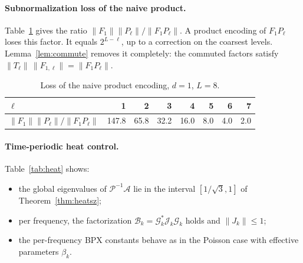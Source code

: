 \documentclass[11pt,a4paper]{article}
\newcommand{\A}{\mathcal{A}}
\newcommand{\B}{\mathcal{B}}
\newcommand{\G}{\mathcal{G}}
\newcommand{\J}{\mathcal{J}}
\theoremstyle{remark}
\begin{document}
\paragraph{Subnormalization loss of the naive product.} Table~\ref{tab:loss}
gives the ratio $\|F_1\|\|P_\ell\|/\|F_1P_\ell\|$. A product encoding of $F_1P_\ell$
loses this factor. It equals $2^{L-\ell}$, up to a correction on the
coarsest levels. Lemma~\ref{lem:commute} removes it completely: the
commuted factors satisfy $\|T_\ell\|\,\|F_{1,\ell}\|=\|F_1P_\ell\|$.

\begin{table}[ht]
\centering\small
\begin{tabular}{lrrrrrrr}
\toprule
$\ell$ & 1 & 2 & 3 & 4 & 5 & 6 & 7\\
\midrule
$\|F_1\|\|P_\ell\|/\|F_1P_\ell\|$ & 147.8 & 65.8 & 32.2 & 16.0 & 8.0 & 4.0 & 2.0\\
\bottomrule
\end{tabular}
\caption{Loss of the naive product encoding, $d=1$, $L=8$.}
\label{tab:loss}
\end{table}

\paragraph{Time-periodic heat control.} Table~\ref{tab:heat} shows:
\begin{itemize}
\item the global eigenvalues of $\mathcal P^{-1}\A$ lie in the interval
  $[1/\sqrt3,1]$ of Theorem~\ref{thm:heatsz};
\item per frequency, the factorization $\B_k=\G_k^*\J_k\G_k$ holds and
  $\|J_k\|\le1$;
\item the per-frequency BPX constants behave as in the Poisson case with
  effective parameters $\beta_k$.
\end{itemize}
\end{document}
